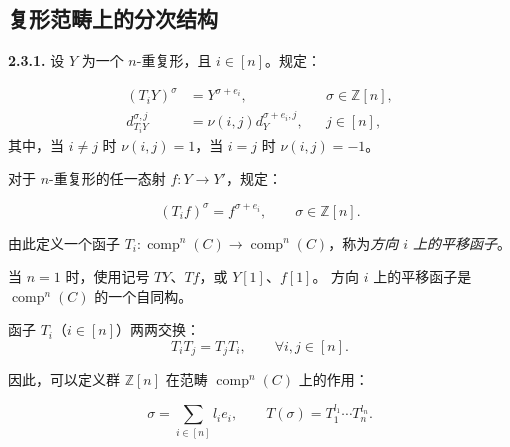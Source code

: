\clearpage
{}%
\subsection{复形范畴上的分次结构}

\noindent\textbf{2.3.1.}\quad
设 $Y$ 为一个 $n$-重复形，且 $i\in[n]$。规定：

\begin{equation}
  \begin{aligned}
    (T_iY)^\sigma&=Y^{\sigma+e_i},
      &&\sigma\in\mathbb Z[n],\\
    d_{T_iY}^{\sigma,j}&=\nu(i,j)d_Y^{\sigma+e_i,j},
      &&j\in[n],
  \end{aligned}
  \tag{2.3.1.1}
\end{equation}
其中，当 $i\ne j$ 时 $\nu(i,j)=1$，当 $i=j$ 时 $\nu(i,j)=-1$。

对于 $n$-重复形的任一态射
$f\colon Y\longrightarrow Y'$，规定：

\begin{equation}
  (T_if)^\sigma=f^{\sigma+e_i},
  \qquad \sigma\in\mathbb Z[n].
  \tag{2.3.1.2}
\end{equation}

由此定义一个函子
$T_i\colon\operatorname{comp}^{n}(C)\longrightarrow
\operatorname{comp}^{n}(C)$，称为\emph{方向 $i$ 上的平移函子}。

当 $n=1$ 时，使用记号 $TY$、$Tf$，或 $Y[1]$、$f[1]$。
方向 $i$ 上的平移函子是 $\operatorname{comp}^{n}(C)$ 的一个自同构。

函子 $T_i$（$i\in[n]$）两两交换：
\begin{equation}
  T_iT_j=T_jT_i,
  \qquad \forall i,j\in[n].
  \tag{2.3.1.3}
\end{equation}

因此，可以定义群 $\mathbb Z[n]$ 在范畴
$\operatorname{comp}^{n}(C)$ 上的作用：

\begin{equation}
  \sigma=\sum_{i\in[n]}l_ie_i,
  \qquad
  T(\sigma)=T_1^{l_1}\cdots T_n^{l_n}.
  \tag{2.3.1.4}
\end{equation}

